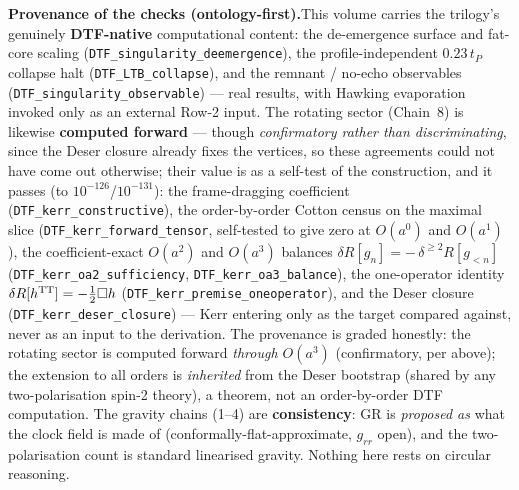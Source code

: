 \documentclass[11pt]{article}
\begin{document}
\begin{tcolorbox}
\textbf{Provenance of the checks (ontology-first).}\enspace This volume carries the trilogy's genuinely
\textbf{DTF-native} computational content: the de-emergence surface and fat-core scaling
(\texttt{DTF\_singularity\_deemergence}), the profile-independent $0.23\,t_P$ collapse halt
(\texttt{DTF\_LTB\_collapse}), and the remnant / no-echo observables
(\texttt{DTF\_singularity\_observable}) --- real results, with Hawking evaporation~\cite{Hawking1975}
invoked only as an external Row-2 input. The rotating sector (Chain~8) is likewise \textbf{computed forward}
--- though \emph{confirmatory rather than discriminating}, since the Deser closure already fixes the
vertices, so these agreements could not have come out otherwise; their value is as a self-test of the
construction, and it passes (to $10^{-126}$/$10^{-131}$): the frame-dragging coefficient (\texttt{DTF\_kerr\_constructive}), the order-by-order Cotton
census on the maximal slice (\texttt{DTF\_kerr\_forward\_tensor}, self-tested to give zero at $O(a^0)$ and
$O(a^1)$), the coefficient-exact $O(a^2)$ and $O(a^3)$ balances $\delta R[g_n]=-\,\delta^{\ge2}R[g_{<n}]$
(\texttt{DTF\_kerr\_oa2\_sufficiency}, \texttt{DTF\_kerr\_oa3\_balance}), the one-operator identity
$\delta R[h^{\rm TT}]=-\tfrac12\Box h$ (\texttt{DTF\_kerr\_premise\_oneoperator}), and the Deser closure
(\texttt{DTF\_kerr\_deser\_closure}) --- Kerr entering only as the target compared against, never as an
input to the derivation. The provenance is graded honestly: the rotating sector is computed
forward \emph{through $O(a^3)$} (confirmatory, per above); the extension to all orders is \emph{inherited} from the Deser bootstrap
(shared by any two-polarisation spin-2 theory), a theorem, not an order-by-order DTF computation. The
gravity chains (1--4) are \textbf{consistency}: GR is \emph{proposed as} what
the clock field is made of (conformally-flat-approximate, $g_{rr}$ open), and the two-polarisation count
is standard linearised gravity. Nothing here rests on circular reasoning.
\end{tcolorbox}

\appendix
\end{document}

